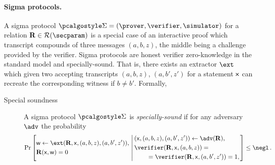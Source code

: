 \let\accentvec\vec \documentclass[runningheads,10pt]{llncs}
\begin{document}
\paragraph{Sigma protocols.}
A sigma protocol $\sigmaprot = (\prover, \verifier, \simulator)$  for a relation
$\REL \in \RELGEN(\secparam)$  is a special case of an interactive proof which transcript compounds of three messages $(a, b, z)$, the middle being a challenge provided by the verifier.
Sigma protocols are honest verifier zero-knowledge in the standard model and specially-sound. That
is, there exists an extractor $\ext$ which given two accepting transcripts $(a, b, z)$, $(a, b', z')$ for a statement $\mathsf{x}$ can recreate the corresponding witness if $b \neq b'$. Formally,
\begin{description}
	\item[Special soundness] A sigma protocol $\sigmaprot$ is \emph{specially-sound} if for any adversary $\adv$ the probability
	\[
		\Pr\left[
		\begin{aligned}
				& \wit \gets \ext(\REL, \inp, (a, b, z), (a, b', z')),\\
				& \REL(\inp, \wit) = 0
		\end{aligned}
		\,\left|\,
		\begin{aligned}
			& (\inp, (a, b, z), (a, b', z')) \gets \adv(\REL), \\
			& \verifier(\REL, \inp, (a, b, z)) = \\
			& \qquad = \verifier(\REL, \inp, (a, b', z')) = 1, \\
		\end{aligned}
		\right.\right] \leq  \negl\,.
	\]
\end{description}

\end{document}
